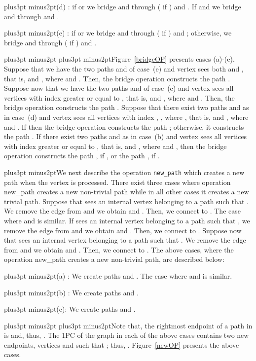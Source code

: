 \documentclass[10pt]{article}
\def\yskip{\penalty-50\vskip3pt plus3pt minus2pt}
\def\y{\yskip}
\def\yy{\yskip\yskip}
\begin{document}
{\y \noindent (d) : if  or  we bridge  and  through
\phantom{(d)}  ( if ) and . If
 and  we bridge  and
 through  and .

\y \noindent (e) : if  or  we bridge  and  through
\phantom{(e)}  ( if ) and ;
otherwise, we bridge  and  through  ( if ) and .



\yy \noindent Figure~\ref{bridgeOP} presents cases (a)-(e).
Suppose that we have the two paths  and  of case~(e) and
vertex  sees both  and , that is,  and , where  and . Then, the bridge
operation constructs the path . Suppose now that we have
the two paths  and  of case~(c) and vertex  sees
all vertices with index greater or equal to , that is,
 and , where  and . Then, the
bridge operation constructs the path . Suppose that there
exist two paths  and  as in case~(d) and vertex 
sees all vertices with index , , where , that is, 
and , where  and .
If  then the bridge operation constructs the path ;
otherwise, it constructs the path  . If there exist two
paths  and  as in case~(b) and vertex  sees all
vertices with index greater or equal to , that is,  and , where  and , then the bridge
operation constructs the path , if , or the path
, if .

\y We next describe the operation {\tt new\_path} which creates a
new path when the vertex  is processed. There exist three
cases where operation new\_path creates a new non-trivial path
while in all other cases it creates a new trivial path. Suppose
that  sees an internal vertex  belonging to a path
 such that
. We remove the edge  from 
and we obtain  and . Then, we connect  to . The case where  and  is similar. If  sees an
internal vertex  belonging to a path  such that , we
remove the edge  from  and we obtain  and . Then, we connect 
to . Suppose now that  sees an internal vertex 
belonging to a path  such that . We remove the edge
 from  and we obtain 
and . Then, we connect  to . The
above cases, where the operation new\_path creates a new
non-trivial path, are described below:

\y \noindent (a) : We create paths
 and . The case \phantom{(a) }where  and
 is similar.

\y \noindent (b) : We create paths
 and .

\y \noindent (c)\phantom{c}: We create
paths  and .



\yy Note that, the rightmost endpoint of a path in
 is 
and, thus, . The 1PC
 of the graph  in each of the
above cases contains two new endpoints, vertices  and
 such that ; thus, .
Figure~\ref{newOP} presents the above cases.

}
\end{document}
